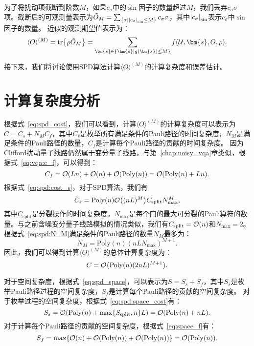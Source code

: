 为了将扰动项截断到阶数$M$，如果$c_\sigma$中的$\sin$因子的数量超过$M$，我们丢弃$c_\sigma \sigma$项。截断后的可观测量表示为$\tilde{O}_M=\sum_{\{\sigma\mid \abs{c_\sigma}_{\sin}\leq M\}} c_\sigma \sigma$，其中$\abs{c_\sigma}_{\sin}$表示$c_\sigma$中$\sin$因子的数量。
近似的观测期望值表示为：
\begin{equation}\label{eq:sim_noiseless}
  \langle O \rangle ^{(M)}= \tr{\rho \tilde{O}_M}= \sum_{\bm{s}\in \{\bm{s}\mid g(\bm{s})\leq M\}} f(\mathcal{U},\bm{s},O,\rho).
\end{equation}

接下来，我们将讨论使用SPD算法计算$\langle O \rangle ^{(M)}$的计算复杂度和误差估计。

\section{计算复杂度分析}
根据式~\eqref{eq:spd_cost}，我们可以看到，计算$\langle O \rangle ^{(M)}$的计算复杂度可以表示为$C = C_s+N_MC_f$，其中$C_s$是枚举所有满足条件的Pauli路径的时间复杂度，$N_M$是满足条件的Pauli路径的数量，$C_f$是计算每个Pauli路径的贡献的时间复杂度。
因为Clifford扰动量子线路仍然属于变分量子线路，与第~\ref{chap:noisy_vqa}章类似，根据式~\eqref{eq:vqa:c_f}，可以得到：
\begin{equation}
    C_f=\order{L n}+\order{n}+\order{\poly(n)}=\order{\poly(n)+L n}.
\end{equation}
根据式~\eqref{eq:spd:cost_s}，对于SPD算法，我们有
\begin{equation}
    C_s=\mathrm{Poly}(n) \order{(nL)^{M}} C_{\text{split}} N_{\text{max}}^{M},
\end{equation}
其中$C_{\text{split}}$是分裂操作的时间复杂度，$N_{\text{max}}$是每个门的最大可分裂的Pauli算符的数量。与之前含噪变分量子线路模拟的情况类似，我们有$C_{\text{split}}=\order{n}$和$N_{\text{max}}=2$。
根据式~\eqref{eq:spd:N_M}满足条件的Pauli路径的数量$N_M$最多为：
\begin{equation}
    N_M=\mathrm{Poly}(n) (nLN_{\text{max}})^{M+1}.
\end{equation}
因此，我们可以得到计算$\langle O \rangle ^{(M)}$的总体计算复杂度为：
\begin{equation}
    C=\order{\mathrm{Poly}(n) (2nL)^{M+1}}.
\end{equation}

对于空间复杂度，根据式~\eqref{eq:spd_space}，可以表示为$S = S_s+S_f$，其中$S_s$是枚举Pauli路径过程的空间复杂度，$S_f$是计算每个Pauli路径的贡献的空间复杂度。
对于枚举过程的空间复杂度，根据式~\eqref{eq:spd:space_cost}有：
\begin{equation}
    S_{s}=\order{\mathrm{Poly}(n)+\max\{S_{\text{split}},n\}L}=\order{\mathrm{Poly}(n)+nL}.
\end{equation}
对于计算每个Pauli路径的贡献的空间复杂度，根据式~\eqref{eq:space_f}有：
\begin{equation}
    S_f=\max\{\order{n}+\order{\poly(n)}+\order{\poly(n)}\}=\order{\poly(n)}.
\end{equation}


